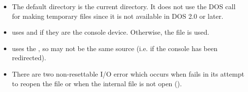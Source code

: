 \begin{itemize}
\item
    The  default directory is the current directory.
    It does not use the DOS call for making temporary files since
    it is not available in DOS 2.0 or later.

\item
     uses  and 
     if they are the console device.
    Otherwise, the file  is used. 
\item
     uses the , so 
     may not be the same source 
    (i.e. if the console has been redirected).
\item
    There are two non-resettable I/O error which occurs when 
    fails in its attempt to reopen the file or when the internal file
    is not open ().
    
\end{itemize}

